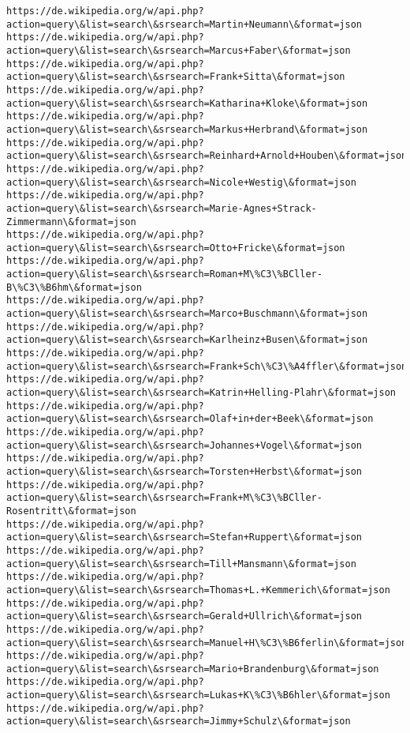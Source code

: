 \documentclass[11pt]{article}
\begin{document}
\begin{Verbatim}[commandchars=\\\{\}]
https://de.wikipedia.org/w/api.php?action=query\&list=search\&srsearch=Martin+Neumann\&format=json
https://de.wikipedia.org/w/api.php?action=query\&list=search\&srsearch=Marcus+Faber\&format=json
https://de.wikipedia.org/w/api.php?action=query\&list=search\&srsearch=Frank+Sitta\&format=json
https://de.wikipedia.org/w/api.php?action=query\&list=search\&srsearch=Katharina+Kloke\&format=json
https://de.wikipedia.org/w/api.php?action=query\&list=search\&srsearch=Markus+Herbrand\&format=json
https://de.wikipedia.org/w/api.php?action=query\&list=search\&srsearch=Reinhard+Arnold+Houben\&format=json
https://de.wikipedia.org/w/api.php?action=query\&list=search\&srsearch=Nicole+Westig\&format=json
https://de.wikipedia.org/w/api.php?action=query\&list=search\&srsearch=Marie-Agnes+Strack-Zimmermann\&format=json
https://de.wikipedia.org/w/api.php?action=query\&list=search\&srsearch=Otto+Fricke\&format=json
https://de.wikipedia.org/w/api.php?action=query\&list=search\&srsearch=Roman+M\%C3\%BCller-B\%C3\%B6hm\&format=json
https://de.wikipedia.org/w/api.php?action=query\&list=search\&srsearch=Marco+Buschmann\&format=json
https://de.wikipedia.org/w/api.php?action=query\&list=search\&srsearch=Karlheinz+Busen\&format=json
https://de.wikipedia.org/w/api.php?action=query\&list=search\&srsearch=Frank+Sch\%C3\%A4ffler\&format=json
https://de.wikipedia.org/w/api.php?action=query\&list=search\&srsearch=Katrin+Helling-Plahr\&format=json
https://de.wikipedia.org/w/api.php?action=query\&list=search\&srsearch=Olaf+in+der+Beek\&format=json
https://de.wikipedia.org/w/api.php?action=query\&list=search\&srsearch=Johannes+Vogel\&format=json
https://de.wikipedia.org/w/api.php?action=query\&list=search\&srsearch=Torsten+Herbst\&format=json
https://de.wikipedia.org/w/api.php?action=query\&list=search\&srsearch=Frank+M\%C3\%BCller-Rosentritt\&format=json
https://de.wikipedia.org/w/api.php?action=query\&list=search\&srsearch=Stefan+Ruppert\&format=json
https://de.wikipedia.org/w/api.php?action=query\&list=search\&srsearch=Till+Mansmann\&format=json
https://de.wikipedia.org/w/api.php?action=query\&list=search\&srsearch=Thomas+L.+Kemmerich\&format=json
https://de.wikipedia.org/w/api.php?action=query\&list=search\&srsearch=Gerald+Ullrich\&format=json
https://de.wikipedia.org/w/api.php?action=query\&list=search\&srsearch=Manuel+H\%C3\%B6ferlin\&format=json
https://de.wikipedia.org/w/api.php?action=query\&list=search\&srsearch=Mario+Brandenburg\&format=json
https://de.wikipedia.org/w/api.php?action=query\&list=search\&srsearch=Lukas+K\%C3\%B6hler\&format=json
https://de.wikipedia.org/w/api.php?action=query\&list=search\&srsearch=Jimmy+Schulz\&format=json

\end{Verbatim}
\end{document}
